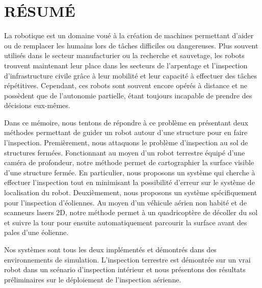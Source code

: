 %
%
\chapter*{RÉSUMÉ}\thispagestyle{headings}

La robotique est un domaine voué à la création de machines permettant d'aider
ou de remplacer les humains lors de tâches difficiles ou dangereuses. Plus souvent
utilisés dans le secteur manufacturier ou la recherche et sauvetage, les robots
trouvent maintenant leur place dans les secteurs de l'arpentage et l'inspection
d'infrastructure civile grâce à leur mobilité et leur capacité à effectuer des
tâches répétitives. Cependant, ces robots sont souvent encore opérés à distance
et ne possèdent que de l'autonomie partielle, étant toujours incapable de prendre
des décisions eux-mêmes.

Dans ce mémoire, nous tentons de répondre à ce problème en présentant deux
méthodes permettant de guider un robot autour d'une structure pour en faire
l'inspection. Premièrement, nous attaquons le problème d'inspection au sol de
structures fermées. Fonctionnant au moyen d'un robot terrestre équipé d'une
caméra de profondeur, notre méthode permet de cartographier la surface visible
d'une structure fermée. En particulier, nous proposons un système qui cherche
à effectuer l'inspection tout en minimisant la possibilité d'erreur sur le système
de localisation du robot. Deuxièmement, nous proposons un système spécifiquement
pour l'inspection d'éoliennes. Au moyen d'un véhicule aérien
non habité et de scanneurs lasers 2D, notre méthode permet à un quadricoptère de décoller
du sol et suivre la tour pour ensuite automatiquement parcourir la surface avant
des pales d'une éolienne.

Nos systèmes sont tous les deux implémentés et démontrés dans des environnements
de simulation. L'inspection terrestre est démontrée sur un vrai robot dans un
scénario d'inspection intérieur et nous présentons des résultats préliminaires
sur le déploiement de l'inspection aérienne.
